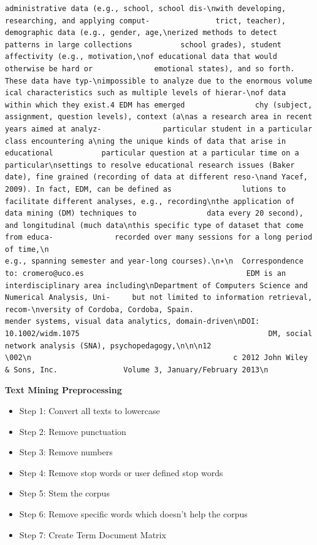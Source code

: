 \documentclass[
]{article}
\providecommand{\tightlist}{%
  \setlength{\itemsep}{0pt}\setlength{\parskip}{0pt}}
\begin{document}
\begin{verbatim}
administrative data (e.g., school, school dis-\nwith developing, researching, and applying comput-               trict, teacher), demographic data (e.g., gender, age,\nerized methods to detect patterns in large collections           school grades), student affectivity (e.g., motivation,\nof educational data that would otherwise be hard or              emotional states), and so forth. These data have typ-\nimpossible to analyze due to the enormous volume                 ical characteristics such as multiple levels of hierar-\nof data within which they exist.4 EDM has emerged                chy (subject, assignment, question levels), context (a\nas a research area in recent years aimed at analyz-              particular student in a particular class encountering a\ning the unique kinds of data that arise in educational           particular question at a particular time on a particular\nsettings to resolve educational research issues (Baker           date), fine grained (recording of data at different reso-\nand Yacef, 2009). In fact, EDM, can be defined as                lutions to facilitate different analyses, e.g., recording\nthe application of data mining (DM) techniques to                data every 20 second), and longitudinal (much data\nthis specific type of dataset that come from educa-              recorded over many sessions for a long period of time,\n                                                                 e.g., spanning semester and year-long courses).\n∗\n  Correspondence to: cromero@uco.es                                     EDM is an interdisciplinary area including\nDepartment of Computers Science and Numerical Analysis, Uni-     but not limited to information retrieval, recom-\nversity of Cordoba, Cordoba, Spain.                              mender systems, visual data analytics, domain-driven\nDOI: 10.1002/widm.1075                                           DM, social network analysis (SNA), psychopedagogy,\n\n\n12                                            \002\n                                              c 2012 John Wiley & Sons, Inc.               Volume 3, January/February 2013\n
\end{verbatim}

\textbf{Text Mining Preprocessing}

\begin{itemize}
\tightlist
\item
  Step 1: Convert all texts to lowercase
\item
  Step 2: Remove punctuation
\item
  Step 3: Remove numbers
\item
  Step 4: Remove stop words or user defined stop words
\item
  Step 5: Stem the corpus
\item
  Step 6: Remove specific words which doesn't help the corpus
\item
  Step 7: Create Term Document Matrix
\end{itemize}
\end{document}
